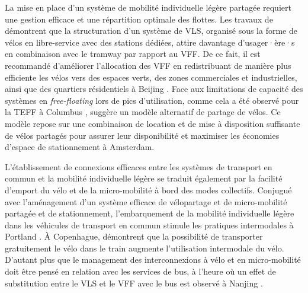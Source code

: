 \begin{refsegment}
La mise en place d'un système de mobilité individuelle légère partagée requiert une gestion efficace et une répartition optimale des flottes. Les travaux de \textcolor{blue}{\textcite[197]{radzimski_exploring_2021}} démontrent que la structuration d'un système de \acrshort{VLS}, organisé sous la forme de vélos en libre-service avec des stations dédiées, attire davantage d'usager·ère·s en combinaison avec le tramway par rapport au \acrshort{VFF}. De ce fait, il est recommandé d'améliorer l'allocation des \acrshort{VFF} en redistribuant de manière plus efficiente les vélos vers des espaces verts, des zones commerciales et industrielles, ainsi que des quartiers résidentiels à Beijing \textcolor{blue}{\autocite[12]{liu_temporal_2022}}. Face aux limitations de capacité des systèmes en \textsl{free-floating} lors de pics d'utilisation, comme cela a été observé pour la \acrshort{TEFF} à Columbus \textcolor{blue}{\autocite[9]{liu_measuring_2022}}, \textcolor{blue}{\textcite[69, 95]{nat_bicycle_2018}} suggère un modèle alternatif de partage de vélos. Ce modèle repose sur une combinaison de location et de mise à disposition suffisante de vélos partagés pour assurer leur disponibilité et maximiser les économies d'espace de stationnement à Amsterdam.%

L'établissement de connexions efficaces entre les systèmes de transport en commun et la mobilité individuelle légère se traduit également par la facilité d'emport du vélo et de la micro-mobilité à bord des modes collectifs. Conjugué avec l'aménagement d'un système efficace de vélopartage et de micro-mobilité partagée et de stationnement, l'embarquement de la mobilité individuelle légère dans les véhicules de transport en commun stimule les pratiques intermodales à Portland \textcolor{blue}{\autocite[93]{singleton_exploring_2014}}. À Copenhague, \textcolor{blue}{\textcite[19]{halldorsdottir_home-end_2017}} démontrent que la possibilité de transporter gratuitement le vélo dans le train augmente l'utilisation intermodale du vélo. D'autant plus que le management des interconnexions à vélo et en micro-mobilité doit être pensé en relation avec les services de bus, à l'heure où un effet de substitution entre le \acrshort{VLS} et le \acrshort{VFF} avec le bus est observé à Nanjing \textcolor{blue}{\autocite[12]{chen_what_2022}}.%


\end{refsegment}
